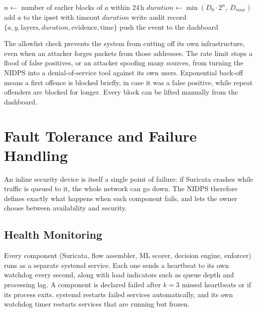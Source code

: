 \begin{algorithm}[H]
\caption{Enforce a BLOCK verdict}
\label{alg:block}
$n \leftarrow$ number of earlier blocks of $a$ within 24\,h\;
$duration \leftarrow \min(D_0 \cdot 2^n,\ D_{max})$ 
add $a$ to the ipset with timeout $duration$\;
write audit record $\{a, y, \mathrm{layers}, duration, \mathrm{evidence}, \mathrm{time}\}$\;
push the event to the dashboard\;
\end{algorithm}

\noindent The allowlist check prevents the system from cutting off its own infrastructure, even when an attacker forges packets from those addresses. The rate limit stops a flood of false positives, or an attacker spoofing many sources, from turning the NIDPS into a denial-of-service tool against its own users. Exponential back-off means a first offence is blocked briefly, in case it was a false positive, while repeat offenders are blocked for longer. Every block can be lifted manually from the dashboard.

\section{Fault Tolerance and Failure Handling}\label{sec:5.9}
\label{sec:failure}
\noindent An inline security device is itself a single point of failure: if Suricata crashes while traffic is queued to it, the whole network can go down. The NIDPS therefore defines exactly what happens when each component fails, and lets the owner choose between availability and security.

\subsection{Health Monitoring}\label{sec:5.9.1}
\label{sec:health}
\noindent Every component (Suricata, flow assembler, ML scorer, decision engine, enforcer) runs as a separate systemd service. Each one sends a heartbeat to its own watchdog every second, along with load indicators such as queue depth and processing lag. A component is declared failed after $k = 3$ missed heartbeats or if its process exits. systemd restarts failed services automatically, and its own watchdog timer restarts services that are running but frozen.

